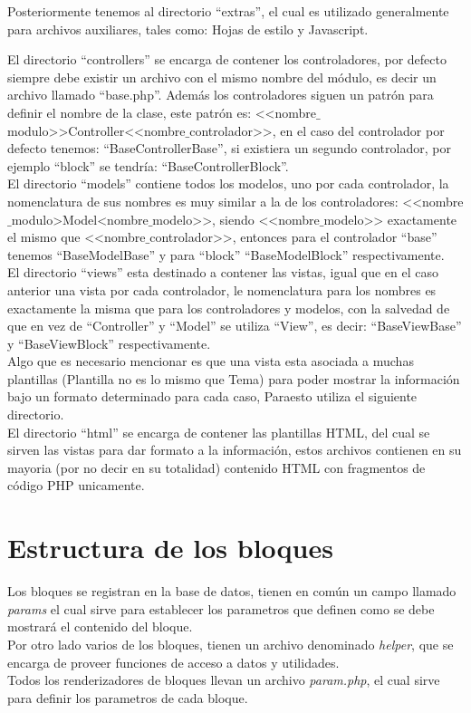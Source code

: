 Posteriormente tenemos al directorio ``extras'', el cual es utilizado generalmente para archivos auxiliares, tales como: Hojas de estilo y Javascript.

El directorio ``controllers'' se encarga de contener los controladores, por defecto siempre debe existir un archivo con el mismo nombre del m\'odulo, es decir un archivo llamado ``base.php''. Adem\'as los controladores siguen un patr\'on para definir el nombre de la clase, este patr\'on es: <<nombre$\_$modulo>>Controller<<nombre$\_$controlador>>, en el caso del controlador por defecto tenemos: ``BaseControllerBase'', si existiera un segundo controlador, por ejemplo ``block'' se tendr\'ia: ``BaseControllerBlock''.\\

El directorio ``models'' contiene todos los modelos, uno por cada controlador, la nomenclatura de sus nombres es muy similar a la de los controladores: <<nombre$\_$modulo>Model<nombre$\_$modelo>>, siendo <<nombre$\_$modelo>> exactamente el mismo que <<nombre$\_$controlador>>, entonces para el controlador ``base'' tenemos ``BaseModelBase'' y para ``block'' ``BaseModelBlock'' respectivamente.\\

El directorio ``views'' esta destinado a contener las vistas, igual que en el caso anterior una vista por cada controlador, le nomenclatura para los nombres es exactamente la misma que para los controladores y modelos, con la salvedad de que en vez de ``Controller'' y ``Model'' se utiliza ``View'', es decir: ``BaseViewBase'' y ``BaseViewBlock'' respectivamente.\\

Algo que es necesario mencionar es que una vista esta asociada a muchas plantillas (Plantilla no es lo mismo que Tema) para poder mostrar la informaci\'on bajo un formato determinado para cada caso, Paraesto utiliza el siguiente directorio.\\

El directorio ``html'' se encarga de contener las plantillas HTML, del cual se sirven las vistas para dar formato a la informaci\'on, estos archivos contienen en su mayoria (por no decir en su totalidad) contenido HTML con fragmentos de c\'odigo PHP unicamente.\\

\section{Estructura de los bloques}
Los bloques se registran en la base de datos, tienen en com\'un un campo llamado \textit{params} el cual sirve para establecer los parametros que definen como se debe mostrar\'a el contenido del bloque.\\
Por otro lado varios de los bloques, tienen un archivo denominado \textit{helper}, que se encarga de proveer funciones de acceso a datos y utilidades.\\
Todos los renderizadores de bloques llevan un archivo \textit{param.php}, el cual sirve para definir los parametros de cada bloque.\\

